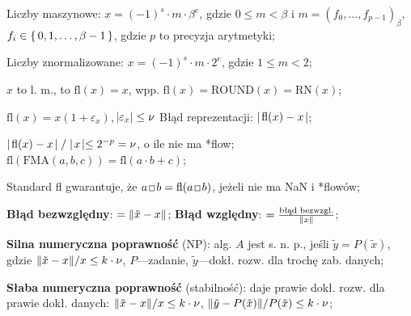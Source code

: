 
\entry
Liczby maszynowe: $x=(-1)^s \cdot m \cdot \beta^e$, gdzie $0\leq m < \beta$ i $m=(f_0, \ldots, f_{p-1})_\beta$, $f_i\in\set{0,1,\ldots,\beta-1}$, gdzie $p$ to precyzja arytmetyki;

\entry
Liczby znormalizowane: $x=(-1)^s\cdot m \cdot 2^e$, gdzie $1\leq m < 2$;

\entry
$x$ to l. m.,
to $\mathrm{fl}(x)=x$,
wpp. $\mathrm{fl}(x)=\mathrm{ROUND}(x)=\mathrm{RN}(x)$;

\entry
$\mathrm{fl}(x) = x(1+\varepsilon_x)$, $\abs{\varepsilon_x}\leq \nu$
\entry
Błąd reprezentacji: $\mid\! \mathrm{fl}(x) - x\! \mid$;

\entry
$\mid\! \mathrm{fl}(x) - x\! \mid / \mid\! x\! \mid\leq 2^{-p}=\nu$, o ile nie ma *flow;
\entry
$\mathrm{fl}(\mathrm{FMA}(a,b,c)) = \mathrm{fl}(a \cdot b + c)$;

\entry
Standard fl gwarantuje, że $a\, \Hsquare\, b = \mathrm{fl}(a \,\Hsquare\, b)$, jeżeli nie ma NaN i *flowów;


\entry
\textbf{Błąd bezwzględny}:
$=\|\tilde{x} - x\|$;
\entry
\textbf{Błąd względny}:
$=\frac{\text{błąd bezwzgl.}}{\|x\|}$;

\entry
\textbf{Silna numeryczna poprawność} (NP):
alg. $A$ jest s. n. p.,
jeśli $\tilde{y} = P(\tilde{x})$,
gdzie $\|\tilde{x}-x\| / x\leq k\cdot\nu$,
$P$---zadanie,
$\tilde{y}$---dokł. rozw. dla trochę zab. danych;

\entry
\textbf{Słaba numeryczna poprawność} (stabilność):
daje prawie dokł. rozw. dla prawie dokł. danych:
$\|\tilde{x}-x\| / x\leq k\cdot\nu$, $\|\tilde{y}-P(\tilde{x})\| / P(\tilde{x})\leq k\cdot\nu$;

